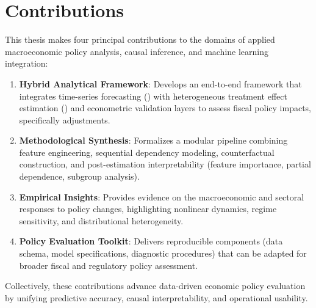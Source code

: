 \section{Contributions}\label{sec:contributions}
This thesis makes four principal contributions to the domains of applied macroeconomic policy analysis, causal inference, and machine learning integration:



\begin{enumerate}[label=\textbf{C\arabic*.}]
  \item \textbf{Hybrid Analytical Framework}: Develops an end-to-end framework that integrates time-series forecasting (\LSTM) with heterogeneous treatment effect estimation (\CF) and econometric validation layers to assess fiscal policy impacts, specifically \VAT{} adjustments.
  \item \textbf{Methodological Synthesis}: Formalizes a modular pipeline combining feature engineering, sequential dependency modeling, counterfactual construction, and post-estimation interpretability (feature importance, partial dependence, subgroup analysis).
  \item \textbf{Empirical Insights}: Provides evidence on the macroeconomic and sectoral responses to \VAT{} policy changes, highlighting nonlinear dynamics, regime sensitivity, and distributional heterogeneity.
  \item \textbf{Policy Evaluation Toolkit}: Delivers reproducible components (data schema, model specifications, diagnostic procedures) that can be adapted for broader fiscal and regulatory policy assessment.
\end{enumerate}

Collectively, these contributions advance data-driven economic policy evaluation by unifying predictive accuracy, causal interpretability, and operational usability.
